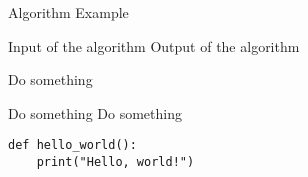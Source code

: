 \documentclass{article}
\begin{document}
\begin{algorithm}[htb]
\caption{Algorithm Example}
\label{alg:algorithm}
\begin{algorithmic}
\Require Input of the algorithm
\Ensure Output of the algorithm

\State Do something

     
        \State Do something
    \EndFor
        \State Do something
    \EndIf
\EndFor
\end{algorithmic}
\end{algorithm}



\begin{lstlisting}[style=mypython,caption={Python code.}, label={code}]
def hello_world():
    print("Hello, world!")
\end{lstlisting}




\clearpage
\printbibliography
\end{document}
